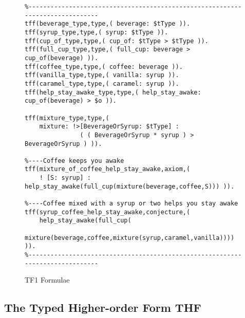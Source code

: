 \documentclass{easychair}
\begin{document}
\begin{figure}[htbp]
\begin{small}
\begin{verbatim}
%------------------------------------------------------------------------------
tff(beverage_type,type,( beverage: $tType )).
tff(syrup_type,type,( syrup: $tType )).
tff(cup_of_type,type,( cup_of: $tType > $tType )).
tff(full_cup_type,type,( full_cup: beverage > cup_of(beverage) )).
tff(coffee_type,type,( coffee: beverage )).
tff(vanilla_type,type,( vanilla: syrup )).
tff(caramel_type,type,( caramel: syrup )).
tff(help_stay_awake_type,type,( help_stay_awake: cup_of(beverage) > $o )).

tff(mixture_type,type,(
    mixture: !>[BeverageOrSyrup: $tType] :
               ( ( BeverageOrSyrup * syrup ) > BeverageOrSyrup ) )).

%----Coffee keeps you awake
tff(mixture_of_coffee_help_stay_awake,axiom,(
    ! [S: syrup] : help_stay_awake(full_cup(mixture(beverage,coffee,S))) )).

%----Coffee mixed with a syrup or two helps you stay awake
tff(syrup_coffee_help_stay_awake,conjecture,(
    help_stay_awake(full_cup(
      mixture(beverage,coffee,mixture(syrup,caramel,vanilla)))) )).
%------------------------------------------------------------------------------
\end{verbatim}
\end{small}
\caption{TF1 Formulae}
\label{TF1Example}
\end{figure}

\subsection{The Typed Higher-order Form THF}
\label{THF}
\end{document}
